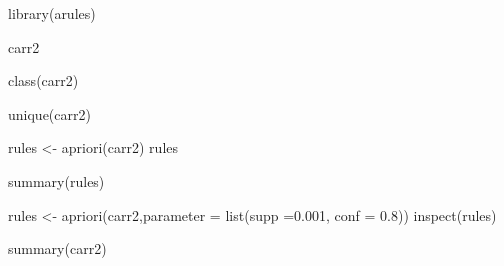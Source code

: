 \documentclass[
]{article}
\newenvironment{Shaded}{\begin{snugshade}}{\end{snugshade}}
\newcommand{\AttributeTok}[1]{\textcolor[rgb]{0.77,0.63,0.00}{#1}}
\newcommand{\FloatTok}[1]{\textcolor[rgb]{0.00,0.00,0.81}{#1}}
\newcommand{\FunctionTok}[1]{\textcolor[rgb]{0.00,0.00,0.00}{#1}}
\newcommand{\NormalTok}[1]{#1}
\newcommand{\OtherTok}[1]{\textcolor[rgb]{0.56,0.35,0.01}{#1}}
\begin{document}
\begin{Shaded}
\begin{Highlighting}[]
\FunctionTok{library}\NormalTok{(arules)}
\end{Highlighting}
\end{Shaded}

\begin{Shaded}
\begin{Highlighting}[]
\NormalTok{carr2}
\end{Highlighting}
\end{Shaded}

\begin{Shaded}
\begin{Highlighting}[]
\FunctionTok{class}\NormalTok{(carr2)}
\end{Highlighting}
\end{Shaded}

\begin{Shaded}
\begin{Highlighting}[]
\FunctionTok{unique}\NormalTok{(carr2)}
\end{Highlighting}
\end{Shaded}

\begin{Shaded}
\begin{Highlighting}[]
\NormalTok{rules }\OtherTok{\textless{}{-}} \FunctionTok{apriori}\NormalTok{(carr2)}
\NormalTok{rules}
\end{Highlighting}
\end{Shaded}

\begin{Shaded}
\begin{Highlighting}[]
\FunctionTok{summary}\NormalTok{(rules)}
\end{Highlighting}
\end{Shaded}

\begin{Shaded}
\begin{Highlighting}[]
\NormalTok{rules }\OtherTok{\textless{}{-}} \FunctionTok{apriori}\NormalTok{(carr2,}\AttributeTok{parameter =} \FunctionTok{list}\NormalTok{(}\AttributeTok{supp =}\FloatTok{0.001}\NormalTok{, }\AttributeTok{conf =} \FloatTok{0.8}\NormalTok{))}
\FunctionTok{inspect}\NormalTok{(rules)}
\end{Highlighting}
\end{Shaded}

\begin{Shaded}
\begin{Highlighting}[]
\FunctionTok{summary}\NormalTok{(carr2)}
\end{Highlighting}
\end{Shaded}
\end{document}
